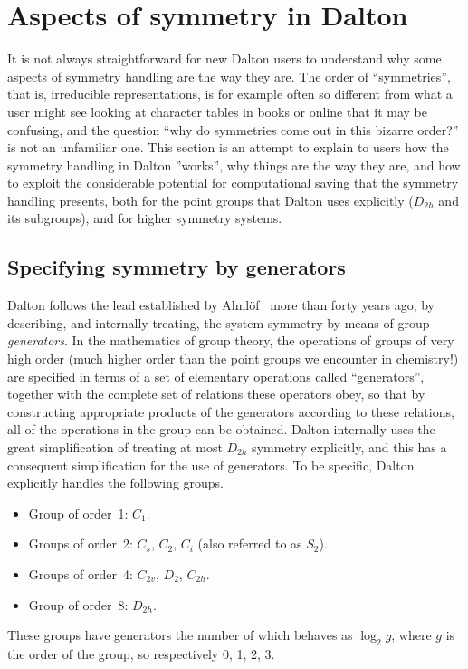 \chapter{Aspects of symmetry in Dalton}

%

It is not always straightforward for new Dalton users to understand
why some aspects of symmetry handling are the way they are.  The order
of ``symmetries'', that is, irreducible representations, is for example often so
different from what a user might see looking at character tables in
books or online that it may be confusing, and the
question ``why do symmetries come out in this bizarre order?'' is not
an unfamiliar one.  This section is an attempt to explain to users how
the symmetry handling in Dalton ''works'', why things are the way they
are, and how to exploit the considerable potential for computational
saving that the symmetry handling presents, both for the point groups
that Dalton uses explicitly ($D_{2h}$ and its subgroups), and for
higher symmetry systems.

\section{Specifying symmetry by generators}

Dalton follows the lead established by Alml{\"o}f~\cite{Alm72} more
than forty
years ago, by describing, and internally treating, the system symmetry
by means of group \emph{generators}.  In the mathematics of group
theory, the operations of groups of very high order (much higher order
than the point groups we encounter in chemistry!) are specified in
terms of a set of elementary operations called ``generators'',
together with the complete set of relations these operators obey, so
that by constructing appropriate products of the generators according
to these relations, all of the operations in the group can be
obtained.  Dalton internally uses the great simplification of treating
at most $D_{2h}$ symmetry explicitly, and this has a consequent
simplification for the use of generators.  To be specific, Dalton
explicitly handles the following groups.
\begin{itemize}
\item Group of order~1: $C_1$.
\item Groups of order~2: $C_s$, $C_2$, $C_i$ (also referred to as
$S_2$).
\item Groups of order~4: $C_{2v}$, $D_2$, $C_{2h}$.
\item Group of order~8: $D_{2h}$.
\end{itemize}
These groups have generators the number of which behaves as $\log_2
g$, where $g$ is
the order of the group, so respectively 0, 1, 2, 3.

